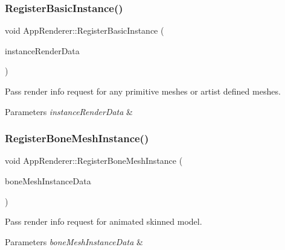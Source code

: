 \subsubsection{\texorpdfstring{Register\+Basic\+Instance()}{RegisterBasicInstance()}}
{\footnotesize\ttfamily void App\+Renderer\+::\+Register\+Basic\+Instance (\begin{DoxyParamCaption}\item[{const \hyperlink{structInstanceRenderData}{Instance\+Render\+Data} \&}]{instance\+Render\+Data }\end{DoxyParamCaption})}



Pass render info request for any primitive meshes or artist defined meshes. 


\begin{DoxyParams}{Parameters}
{\em instance\+Render\+Data} & \\
\hline
\end{DoxyParams}
\mbox{\label{classAppRenderer_a28300e8e65298f09dff5d469dea3f85c}} 
\subsubsection{\texorpdfstring{Register\+Bone\+Mesh\+Instance()}{RegisterBoneMeshInstance()}}
{\footnotesize\ttfamily void App\+Renderer\+::\+Register\+Bone\+Mesh\+Instance (\begin{DoxyParamCaption}\item[{const \hyperlink{structBoneMeshInstanceRenderData}{Bone\+Mesh\+Instance\+Render\+Data} \&}]{bone\+Mesh\+Instance\+Data }\end{DoxyParamCaption})}



Pass render info request for animated skinned model. 


\begin{DoxyParams}{Parameters}
{\em bone\+Mesh\+Instance\+Data} & \\
\hline
\end{DoxyParams}
\mbox{\label{classAppRenderer_ab12a770688fb1d142c6701acebfdd6b4}} 
